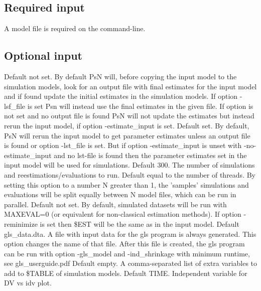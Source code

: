 \subsection{Required input}

A model file is required on the command-line.

\subsection{Optional input}

\begin{optionlist}
Default not set. By default PsN will, before copying the input model to the simulation models, look for an output file with final estimates for the input model and if found update the initial estimates in the simulation models. If option -lsf\_file is set Psn will instead use the final estimates in the given file. If option is not set and no output file is found PsN will not update the estimates but instead rerun the input model, if option -estimate\_input is set. 
\nextopt
{}
Default set. By default, PsN will rerun the input model to get parameter estimates unless an output file is found or option -lst\_file is set. But if option -estimate\_input is unset with -no-estimate\_input and no lst-file is found then the parameter estimates set in the input model will be used for simulations. 
\nextopt
{}
Default 300. The number of simulations and reestimations/evaluations to run. 
\nextopt
{}
Default equal to the number of threads.
By setting this option to a number N greater than 1, the 'samples' simulations and evaluations
will be split equally between N model files, which can be run in parallel.
\nextopt
{}
Default not set. By default, simulated datasets will be run with MAXEVAL=0 (or equivalent for non-classical estimation methods). If option -reminimize is set then \$EST will be the same as in the input model. 
\nextopt
{}
Default gls\_data.dta. A file with input data for the gls program is always generated. This option changes the name of that file. After this file is created, the gls program can be run with option \mbox{-gls\_model} and -ind\_shrinkage with minimum runtime, see gls\_userguide.pdf 
\nextopt
{}
Default empty. A comma-separated list of extra variables to add to \$TABLE of simulation models.
\nextopt
{}
Default TIME. Independent variable for DV vs idv plot.
\nextopt
\end{optionlist}


